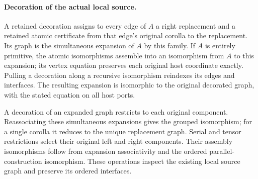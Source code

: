 

\paragraph{Decoration of the actual local source.}
A retained decoration assigns to every edge of $A$ a right replacement and
a retained atomic certificate from that edge's original corolla to the
replacement. Its graph is the simultaneous expansion of $A$ by this family.
If $A$ is entirely primitive, the atomic isomorphisms assemble into an
isomorphism from $A$ to this expansion; its vertex equation preserves each
original host coordinate exactly. Pulling a decoration along a recursive
isomorphism reindexes its edges and interfaces. The resulting expansion
is isomorphic to the original decorated graph, with the stated equation on
all host ports.





\par{}



A decoration of an expanded graph restricts to each original component.
Reassociating these simultaneous expansions gives the grouped isomorphism;
for a single corolla it reduces to the unique replacement graph. Serial and
tensor restrictions select their original left and right components. Their
assembly isomorphisms follow from expansion associativity and the ordered
parallel-construction isomorphism. These operations inspect the existing
local source graph and preserve its ordered interfaces.



